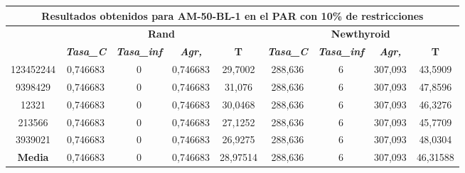 \documentclass[12pt, spanish]{article}
\begin{document}
\begin{table}[H]
\footnotesize
\begin{tabular}{|c|c|c|c|c|c|c|c|c|}
\hline
\multicolumn{9}{|c|}{\textbf{Resultados obtenidos para AM-50-BL-1 en el PAR con 10\% de restricciones}}                                                                                                           \\ \hline
\multirow{2}{*}{} & \multicolumn{4}{c|}{\textbf{Rand}}                                                            & \multicolumn{4}{c|}{\textbf{Newthyroid}}                                                      \\ \cline{2-9} 
                  & \textit{\textbf{Tasa\_C}} & \textit{\textbf{Tasa\_inf}} & \textit{\textbf{Agr,}} & \textbf{T} & \textit{\textbf{Tasa\_C}} & \textit{\textbf{Tasa\_inf}} & \textit{\textbf{Agr,}} & \textbf{T} \\ \hline
123452244         & 0,746683                  & 0                           & 0,746683               & 29,7002    & 288,636                   & 6                           & 307,093                & 43,5909    \\ \hline
9398429           & 0,746683                  & 0                           & 0,746683               & 31,076     & 288,636                   & 6                           & 307,093                & 47,8596    \\ \hline
12321             & 0,746683                  & 0                           & 0,746683               & 30,0468    & 288,636                   & 6                           & 307,093                & 46,3276    \\ \hline
213566            & 0,746683                  & 0                           & 0,746683               & 27,1252    & 288,636                   & 6                           & 307,093                & 45,7709    \\ \hline
3939021           & 0,746683                  & 0                           & 0,746683               & 26,9275    & 288,636                   & 6                           & 307,093                & 48,0304    \\ \hline
\textbf{Media}    & 0,746683                  & 0                           & 0,746683               & 28,97514   & 288,636                   & 6                           & 307,093                & 46,31588   \\ \hline
\end{tabular}
\end{table}
\end{document}
